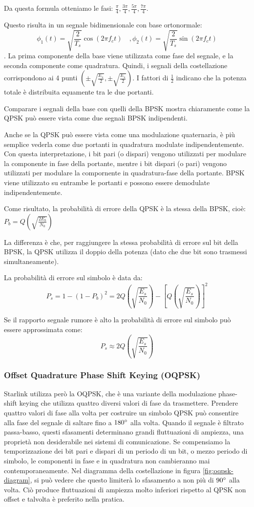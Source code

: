 Da questa formula otteniamo le fasi: $\frac{\pi}{4},\frac{3\pi}{4},\frac{5\pi}{4},\frac{7\pi}{4}$.

Questo risulta in un segnale bidimensionale con base ortonormale: $$\phi_1(t) = \sqrt{\frac{2}{T_s}} \cos(2 \pi f_c t) \quad, \phi_2(t) = \sqrt{\frac{2}{T_s}} \sin(2 \pi f_c t)$$.
La prima componente della base viene utilizzata come fase del segnale, e la seconda componente come quadratura.
Quindi, i segnali della costellazione corrispondono ai 4 punti $(\pm \sqrt{\frac{E_s}{2}}, \pm \sqrt{\frac{E_s}{2}})$.
I fattori di $\frac{1}{2}$ indicano che la potenza totale è distribuita equamente tra le due portanti.

Comparare i segnali della base con quelli della \ac{BPSK} mostra chiaramente come la \ac{QPSK} può essere vista come due segnali \ac{BPSK} indipendenti.

Anche se la \ac{QPSK} può essere vista come una modulazione quaternaria, è più semplice vederla come due portanti in quadratura modulate indipendentemente.
Con questa interpretazione, i bit pari (o dispari) vengono utilizzati per modulare la componente in fase della portante, mentre i bit dispari (o pari) vengono utilizzati per modulare la compornente in quadratura-fase della portante.
\ac{BPSK} viene utilizzato su entrambe le portanti e possono essere demodulate indipendentemente.

Come risultato, la probabilità di errore della \ac{QPSK} è la stessa della \ac{BPSK}, cioè: $P_b = Q(\sqrt{\frac{2 E_b}{N_0}})$

La differenza è che, per raggiungere la stessa probabilità di errore sul bit della \ac{BPSK}, la \ac{QPSK} utilizza il doppio della potenza (dato che due bit sono trasmessi simultaneamente).

La probabilità di errore sul simbolo è data da:
$$P_s = 1 - (1-P_b)^2 = 2Q(\sqrt{\frac{E_s}{N_0}}) - [Q(\sqrt{\frac{E_s}{N_0}})]^2$$

Se il rapporto segnale rumore è alto la probabilità di errore sul simbolo può essere approssimata come:
$$P_s \approx 2Q(\sqrt{\frac{E_s}{N_0}})$$

\subsubsection{Offset Quadrature Phase Shift Keying (OQPSK)}
Starlink utilizza però la \ac{OQPSK}, che è una variante della modulazione phase-shift keying che utilizza quattro diversi valori di fase da trasmettere.
Prendere quattro valori di fase alla volta per costruire un simbolo \ac{QPSK} può consentire alla fase del segnale di saltare fino a $180 \degree$ alla volta.
Quando il segnale è filtrato passa-basso, questi sfasamenti determinano grandi fluttuazioni di ampiezza, una proprietà non desiderabile nei sistemi di comunicazione.
Se compensiamo la temporizzazione dei bit pari e dispari di un periodo di un bit, o mezzo periodo di simbolo, le componenti in fase e in quadratura non cambieranno mai contemporaneamente.
Nel diagramma della costellazione in figura \ref{fig:oqpsk-diagram}, si può vedere che questo limiterà lo sfasamento a non più di $90 \degree$ alla volta.
Ciò produce fluttuazioni di ampiezza molto inferiori rispetto al \ac{QPSK} non offset e talvolta è preferito nella pratica.


